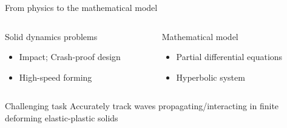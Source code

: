 \begin{withoutheadline}
\begin{frame}{From physics to the mathematical model}
\begin{overprint}
    \begin{columns}
      \begin{column}{0.45\textwidth}
        \begin{block}{Solid dynamics problems}
          \begin{itemize}
          \item[] Impact; Crash-proof design
          \item[] High-speed forming
          \end{itemize}
        \end{block}
      \end{column}
      
      
      \begin{column}{0.55\textwidth}
        \begin{block}{Mathematical model}
          \begin{itemize}
          \item[] Partial differential equations
          \item[] Hyperbolic system
          \end{itemize}
        \end{block}
      \end{column}
    \end{columns}

    \vspace{1.cm}
    \begin{block}{Challenging task}
      \alert{Accurately track waves propagating/interacting in finite deforming elastic-plastic solids }
    \end{block}


\end{overprint}
\end{frame}
\end{withoutheadline}

